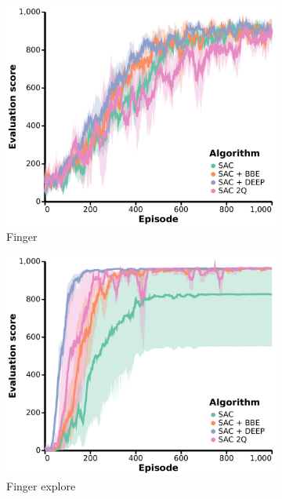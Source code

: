\begin{subappendices}
\begin{figure}[h]
    \begin{subfigure}[b]{0.24\textwidth}
        \centering
        \includegraphics[width=\textwidth]{figures/deep/neurips_SAC2Q_finger.pdf}
        \caption{Finger}
    \end{subfigure}
    \begin{subfigure}[b]{0.24\textwidth}
        \centering
        \includegraphics[width=\textwidth]{figures/deep/neurips_SAC2Q_finger_explore.pdf}
        \caption{Finger explore}
    \end{subfigure}
    \hfill
    \begin{subfigure}[b]{0.24\textwidth}

\end{subfigure}
\end{figure}
\end{subappendices}
